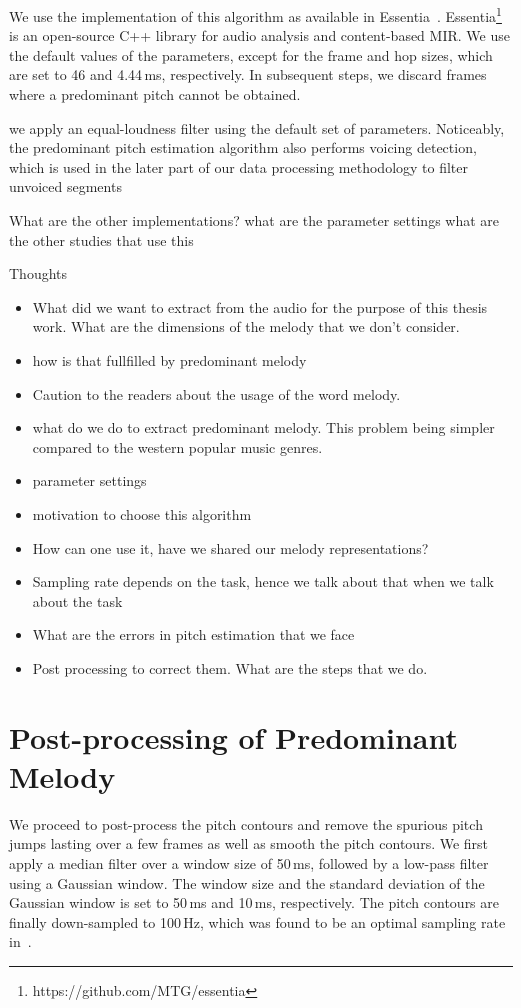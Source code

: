  We use the implementation of this algorithm as available in Essentia~\cite{essentia}. Essentia\footnote{https://github.com/MTG/essentia} is an open-source C++ library for audio analysis and content-based MIR. We use the default values of the parameters, except for the frame and hop sizes, which are set to 46 and 4.44\,ms, respectively. In subsequent steps, we discard frames where a predominant pitch cannot be obtained.
 
 we apply an equal-loudness filter using the default set of parameters. Noticeably, the predominant pitch estimation algorithm also performs voicing detection, which is used in the later part of our data processing methodology to filter unvoiced segments 
 
 What are the other implementations?
 what are the parameter settings
 what are the other studies that use this


Thoughts
\begin{itemize}
	\item What did we want to extract from the audio for the purpose of this thesis work. What are the dimensions of the melody that we don't consider. 
	\item how is that fullfilled by predominant melody
	\item Caution to the readers about the usage of the word melody.
	\item what do we do to extract predominant melody. This problem being simpler compared to the western popular music genres.
	\item parameter settings
	\item motivation to choose this algorithm
	\item How can one use it, have we shared our melody representations?
	\item Sampling rate depends on the task, hence we talk about that when we talk about the task
	\item What are the errors in pitch estimation that we face
	\item Post processing to correct them. What are the steps that we do.
\end{itemize}

\section{Post-processing of Predominant Melody}


We proceed to post-process the pitch contours and remove the spurious pitch jumps lasting over a few frames as well as smooth the pitch contours. We first apply a median filter over a window size of 50\,ms, followed by a low-pass filter using a Gaussian window. The window size and the standard deviation of the Gaussian window is set to 50\,ms and 10\,ms, respectively. The pitch contours are finally down-sampled to 100\,Hz, which was found to be an optimal sampling rate in~\cite{gulati_ICASSP2015}. 

